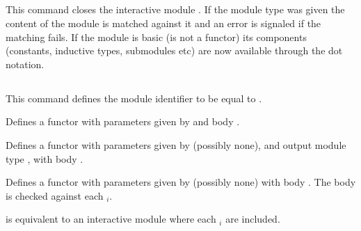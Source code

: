 \subsection{}

This command closes the interactive module {\ident}. If the module type
was given the content of the module is matched against it and an error
is signaled if the matching fails. If the module is basic (is not a
functor) its components (constants, inductive types, submodules etc) are
now available through the dot notation.

\begin{ErrMsgs}
\item {}
\item {}
\item {}
\end{ErrMsgs}


\subsection{}

This command defines the module identifier {\ident} to be equal to
{\modexpr}. 

\begin{Variants}
\item{}

 Defines a functor with parameters given by {\modbindings} and body {\modexpr}.

%
%

\item{}

  Defines a functor with parameters given by {\modbindings} (possibly none),
  and output module type {\modtype}, with body {\modexpr}. 

\item{}

  Defines a functor with parameters given by {\modbindings} (possibly none) 
  with body {\modexpr}. The body is checked against each {\modtype$_i$}.

\item{}

  is equivalent to an interactive module where each {\modexpr$_i$} are included.

\end{Variants}

